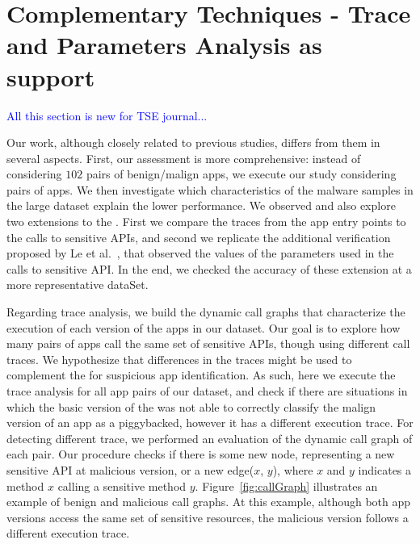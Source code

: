\section{Complementary Techniques - Trace and Parameters Analysis as \mas support}\label{sec:complementary}
\textcolor{blue}{All this section is new for TSE journal...}

Our work, although closely related to previous studies, differs from them in several aspects.  First, our assessment is more comprehensive: instead of considering $102$ pairs of benign/malign apps, we execute our study considering \apps pairs of apps. We then investigate which characteristics of the malware samples in the large dataset explain the lower performance. We observed and also explore two extensions to the \mas. First we compare the traces from the app entry points to the calls to sensitive APIs, and second we replicate the additional verification proposed by Le et al.~\cite{le2018towards}, that observed the values of the parameters used in the calls to sensitive API. In the end, we checked the accuracy of these extension at a more representative dataSet.

Regarding trace analysis, we build the dynamic call graphs that characterize the execution of each version of the apps in our dataset. Our goal is to explore how many pairs of apps call the same set of sensitive APIs, though using different call traces. We hypothesize that differences in the traces might be used to complement the \mas for suspicious app identification. As such, here we execute the trace analysis for all app pairs of our dataset, and check if there are situations in which the basic version of the \mas was not able to correctly classify the malign version of an app as a piggybacked, however it has a different execution trace. For detecting different trace, we performed an evaluation of the dynamic call graph of each pair. Our procedure checks if there is some new node, representing a new sensitive API at malicious version, or a new edge($x$, $y$), where $x$ and $y$ indicates a method $x$ calling a sensitive method $y$. Figure~\ref{fig:callGraph} illustrates an example of benign and malicious call graphs.
At this example, although both app versions access the same set of sensitive resources, the
malicious version follows a different execution trace. 


